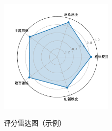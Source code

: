 \begin{figure}[ht]
  \centering
  \includegraphics[width=0.5\textwidth]
  {figures/example_radar.pdf}\\
  \caption{评分雷达图（示例）}
  \label{fig:example_radar} %
\end{figure}

